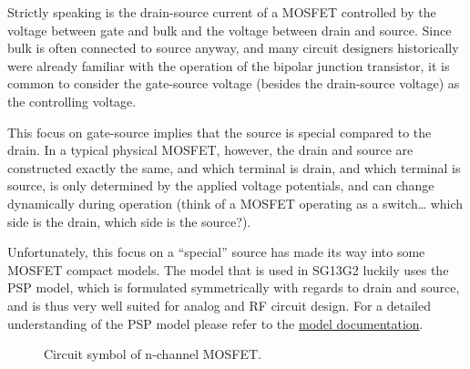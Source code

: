 \documentclass[
  a4paper,
  DIV=11,
  numbers=noendperiod]{scrartcl}
\begin{document}
\begin{tcolorbox}[enhanced jigsaw, titlerule=0mm, left=2mm, coltitle=black, toprule=.15mm, breakable, opacitybacktitle=0.6, colframe=quarto-callout-note-color-frame, bottomtitle=1mm, toptitle=1mm, opacityback=0, colbacktitle=quarto-callout-note-color!10!white, title=\textcolor{quarto-callout-note-color}{\faInfo}\hspace{0.5em}{MOSFET Background}, arc=.35mm, rightrule=.15mm, colback=white, bottomrule=.15mm, leftrule=.75mm]

Strictly speaking is the drain-source current of a MOSFET controlled by
the voltage between gate and bulk and the voltage between drain and
source. Since bulk is often connected to source anyway, and many circuit
designers historically were already familiar with the operation of the
bipolar junction transistor, it is common to consider the gate-source
voltage (besides the drain-source voltage) as the controlling voltage.

This focus on gate-source implies that the source is special compared to
the drain. In a typical physical MOSFET, however, the drain and source
are constructed exactly the same, and which terminal is drain, and which
terminal is source, is only determined by the applied voltage
potentials, and can change dynamically during operation (think of a
MOSFET operating as a switch\ldots{} which side is the drain, which side
is the source?).

Unfortunately, this focus on a ``special'' source has made its way into
some MOSFET compact models. The model that is used in SG13G2 luckily
uses the PSP model, which is formulated symmetrically with regards to
drain and source, and is thus very well suited for analog and RF circuit
design. For a detailed understanding of the PSP model please refer to
the
\href{https://www.nxp.com/wcm_documents/models/mos-models/model-psp/psp102p4_summary.pdf}{model
documentation}.

\end{tcolorbox}

\begin{figure}[H]


\caption{\label{fig-nmos-symbol}Circuit symbol of n-channel MOSFET.}

\end{figure}%
\end{document}
